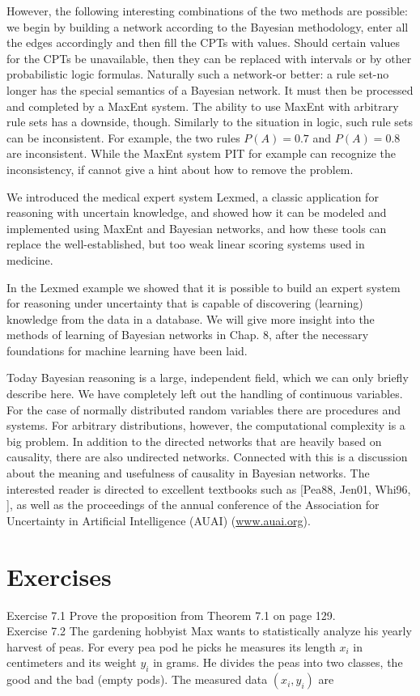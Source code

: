 \documentclass[10pt]{book}
\begin{document}
However, the following interesting combinations of the two methods are possible: we begin by building a network according to the Bayesian methodology, enter all the edges accordingly and then fill the CPTs with values. Should certain values for the CPTs be unavailable, then they can be replaced with intervals or by other probabilistic logic formulas. Naturally such a network-or better: a rule set-no longer has the special semantics of a Bayesian network. It must then be processed and completed by a MaxEnt system.
The ability to use MaxEnt with arbitrary rule sets has a downside, though. Similarly to the situation in logic, such rule sets can be inconsistent. For example, the two rules $P(A)=0.7$ and $P(A)=0.8$ are inconsistent. While the MaxEnt system PIT for example can recognize the inconsistency, if cannot give a hint about how to remove the problem.

We introduced the medical expert system Lexmed, a classic application for reasoning with uncertain knowledge, and showed how it can be modeled and implemented using MaxEnt and Bayesian networks, and how these tools can replace the well-established, but too weak linear scoring systems used in medicine.\footnotemark[21]

In the Lexmed example we showed that it is possible to build an expert system for reasoning under uncertainty that is capable of discovering (learning) knowledge from the data in a database. We will give more insight into the methods of learning of Bayesian networks in Chap. 8, after the necessary foundations for machine learning have been laid.

Today Bayesian reasoning is a large, independent field, which we can only briefly describe here. We have completely left out the handling of continuous variables. For the case of normally distributed random variables there are procedures and systems. For arbitrary distributions, however, the computational complexity is a big problem. In addition to the directed networks that are heavily based on causality, there are also undirected networks. Connected with this is a discussion about the meaning and usefulness of causality in Bayesian networks. The interested reader is directed to excellent textbooks such as [Pea88, Jen01, Whi96, \cite{duda2001pattern}], as well as the proceedings of the annual conference of the Association for Uncertainty in Artificial Intelligence (AUAI) (\href{http://www.auai.org}{www.auai.org}).

\section{Exercises}
Exercise 7.1 Prove the proposition from Theorem 7.1 on page 129.\\
Exercise 7.2 The gardening hobbyist Max wants to statistically analyze his yearly harvest of peas. For every pea pod he picks he measures its length $x_{i}$ in centimeters and its weight $y_{i}$ in grams. He divides the peas into two classes, the good and the bad (empty pods). The measured data $(x_{i}, y_{i})$ are
\end{document}
